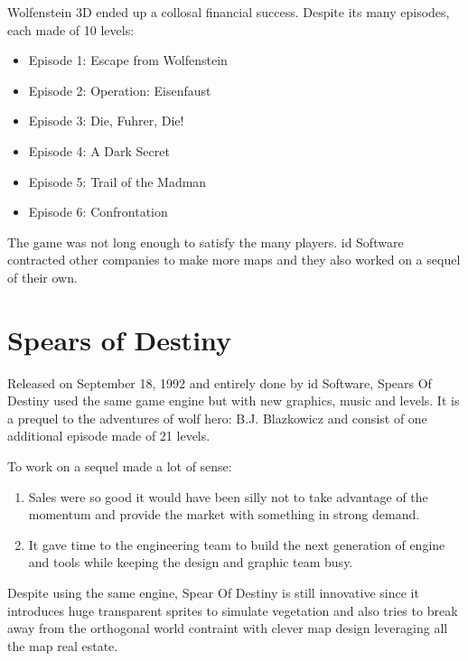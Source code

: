 \documentclass[book.tex]{subfiles}
\begin{document}
Wolfenstein 3D ended up a collosal financial success. Despite its many episodes, each made of 10 levels:\\
\par
\begin{itemize}
\item Episode 1: Escape from Wolfenstein
\item Episode 2: Operation: Eisenfaust
\item Episode 3: Die, Fuhrer, Die!
\item Episode 4: A Dark Secret
\item Episode 5: Trail of the Madman
\item Episode 6: Confrontation
\end{itemize}
The game was not long enough to satisfy the many players. id Software contracted other companies to make more maps and they also worked on a sequel of their own.

\section{Spears of Destiny}
Released on September 18, 1992 and entirely done by id Software, Spears Of Destiny used the same game engine but with new graphics, music and levels. It is a prequel to the adventures of wolf hero: B.J. Blazkowicz and consist of one additional episode made of 21 levels.\\
   \par
\begin{figure}[H]
\centering
 \end{figure}
 \par
 To work on a sequel made a lot of sense:
 \begin{enumerate}
 \item Sales were so good it would have been silly not to take advantage of the momentum and provide the market with something in strong demand.
 \item It gave time to the engineering team to build the next generation of engine and tools while keeping the design and graphic team busy.
 \end{enumerate}
Despite using the same engine, Spear Of Destiny is still innovative since it introduces huge transparent sprites to simulate vegetation and also tries to break away from the orthogonal world contraint with clever map design leveraging all the map real estate.
    \par
\begin{figure}[H]
\centering
 \end{figure}
 \par
\end{document}

